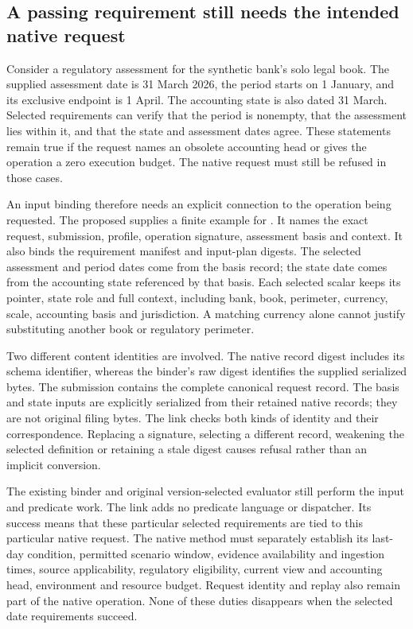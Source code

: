 \subsection{A passing requirement still needs the intended native request}
\label{sec:native-requirement-link}

Consider a regulatory assessment for the synthetic bank's solo legal book.
The supplied assessment date is 31 March 2026, the period starts on 1 January,
and its exclusive endpoint is 1 April. The accounting state is also dated
31 March. Selected requirements can verify that the period is nonempty, that
the assessment lies within it, and that the state and assessment dates agree.
These statements remain true if the request names an obsolete accounting head
or gives the operation a zero execution budget. The native request must still
be refused in those cases.

An input binding therefore needs an explicit connection to the operation being
requested. The proposed  supplies a finite example
for . It names the exact request, submission,
profile, operation signature, assessment basis and context. It also binds the
requirement manifest and input-plan digests. The selected assessment and period
dates come from the basis record; the state date comes from the accounting
state referenced by that basis. Each selected scalar keeps its pointer, state
role and full context, including bank, book, perimeter, currency, scale,
accounting basis and jurisdiction. A matching currency alone cannot justify
substituting another book or regulatory perimeter.

Two different content identities are involved. The native record digest includes
its schema identifier, whereas the binder's raw digest identifies the supplied
serialized bytes. The submission contains the complete canonical request
record. The basis and state inputs are explicitly serialized from their retained
native records; they are not original filing bytes. The link checks both kinds
of identity and their correspondence. Replacing a signature, selecting a
different record, weakening the selected definition or retaining a stale digest
causes refusal rather than an implicit conversion.

The existing binder and original version-selected evaluator still perform the
input and predicate work. The link adds no predicate language or dispatcher.
Its success means that these particular selected requirements are tied to this
particular native request. The native method must separately establish its
last-day condition, permitted scenario window, evidence availability and
ingestion times, source applicability, regulatory eligibility, current view and
accounting head, environment and resource budget. Request identity and replay
also remain part of the native operation. None of these duties disappears when
the selected date requirements succeed.

